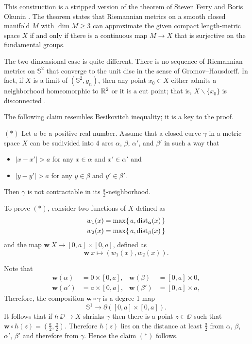 This construction is a stripped version of the theorem of Steven Ferry and Boris Okunin \cite[see][]{ferry-okun}.
The theorem states that Riemannian metrics on a smooth closed manifold $M$ with $\dim M\ge 3$ 
can approximate the given compact length-metric space $X$ 
if and only if 
there is a continuous map $M\to X$ that is surjective on the fundamental groups. 

The two-dimensional case is quite different.
There is no sequence of Riemannian metrics on
$\mathbb{S}^2$ that converge to the unit disc in the sense of Gromov--Hausdorff.
In fact, 
if $X$ is a limit of $(\mathbb{S}^2,g_n)$,
then any point $x_0\in X$ either admits a neighborhood homeomorphic to $\mathbb{R}^2$ or it is a cut point;
that is, $X\backslash\{x_0\}$ is disconnected \cite[see 3.32 in][]{gromov-MetStr}.

The following claim resembles Besikovitch inequality;
it is a key to the proof.
\begin{cl}{$({*})$} Let $a$ be a positive real number.
 Assume that a closed curve $\gamma$ in a metric space $X$ can be sudivided into 4 arcs $\alpha$, $\beta$, $\alpha'$, and $\beta'$ in such a way that 
 \begin{itemize}
 \item $|x-x'|>a$ for any $x\in\alpha$ and $x'\in \alpha'$
 and
 \item $|y-y'|>a$ for any $y\in\beta$ and $y'\in \beta'$.
 \end{itemize}
 Then $\gamma$ is not contractable in its $\tfrac a2$-neighborhood.
\end{cl}


To prove $({*})$, consider two functions of $X$ defined as
\begin{align*}
w_1(x)&=\max\{\,a,\operatorname{\rm dist}\nolimits_{\alpha}(x)\,\}
\\
w_2(x)&=\max\{\,a,\operatorname{\rm dist}\nolimits_{\beta}(x)\,\}
\end{align*}
and the map $\bm{w}\:X\to [0,a]\times[0,a]$, defined as 
\[\bm{w}\:x\mapsto(w_1(x),w_2(x)).\]

Note that 
\begin{align*}
\bm{w}(\alpha)&=0\times [0,a],
&
\bm{w}(\beta)&=[0,a]\times 0,
\\
\bm{w}(\alpha')&=a\times [0,a],
&
\bm{w}(\beta')&=[0,a]\times a,
\end{align*} 
Therefore, the composition $\bm{w}\circ\gamma$ is a degree 1 map 
\[\mathbb{S}^1\to \partial([0,a]\times[0,a]).\] 
It follows that if $h\:\DD\to X$ shrinks $\gamma$ then there is a point $z\in\DD$ such that 
$\bm{w}\circ h(z)=(\tfrac a2,\tfrac a2)$.
Therefore $h(z)$ lies on the distance at least $\tfrac a2$ from $\alpha$, $\beta$, $\alpha'$, $\beta'$
and therefore from $\gamma$.
Hence the claim $({*})$ follows.

